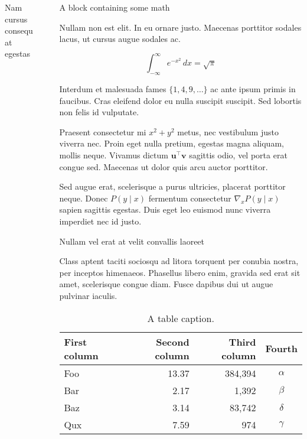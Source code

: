 \documentclass[final]{beamer}
\newlength{\sepwidth}
\newlength{\colwidth}
\newcommand{\separatorcolumn}{\begin{column}{\sepwidth}\end{column}}
\begin{document}
\begin{frame}[t]
\begin{columns}[t]
\begin{column}{\colwidth}
\begin{block}{Nam cursus consequat egestas}
  \end{block}

\end{column}

\separatorcolumn

\begin{column}{\colwidth}

  \begin{block}{A block containing some math}

    Nullam non est elit. In eu ornare justo. Maecenas porttitor sodales lacus,
    ut cursus augue sodales ac.

    $$
    \int_{-\infty}^{\infty} e^{-x^2}\,dx = \sqrt{\pi}
    $$

    Interdum et malesuada fames $\{1, 4, 9, \ldots\}$ ac ante ipsum primis in
    faucibus. Cras eleifend dolor eu nulla suscipit suscipit. Sed lobortis non
    felis id vulputate.


    Praesent consectetur mi $x^2 + y^2$ metus, nec vestibulum justo viverra
    nec. Proin eget nulla pretium, egestas magna aliquam, mollis neque. Vivamus
    dictum $\mathbf{u}^\intercal\mathbf{v}$ sagittis odio, vel porta erat
    congue sed. Maecenas ut dolor quis arcu auctor porttitor.


    Sed augue erat, scelerisque a purus ultricies, placerat porttitor neque.
    Donec $P(y \mid x)$ fermentum consectetur $\nabla_x P(y \mid x)$ sapien
    sagittis egestas. Duis eget leo euismod nunc viverra imperdiet nec id
    justo.

  \end{block}

  \begin{block}{Nullam vel erat at velit convallis laoreet}

    Class aptent taciti sociosqu ad litora torquent per conubia nostra, per
    inceptos himenaeos. Phasellus libero enim, gravida sed erat sit amet,
    scelerisque congue diam. Fusce dapibus dui ut augue pulvinar iaculis.

    \begin{table}
      \centering
      \begin{tabular}{l r r c}
        \toprule
        \textbf{First column} & \textbf{Second column} & \textbf{Third column} & \textbf{Fourth} \\
        \midrule
        Foo & 13.37 & 384,394 & $\alpha$ \\
        Bar & 2.17 & 1,392 & $\beta$ \\
        Baz & 3.14 & 83,742 & $\delta$ \\
        Qux & 7.59 & 974 & $\gamma$ \\
        \bottomrule
      \end{tabular}
      \caption{A table caption.}
    \end{table}


\end{block}
\end{column}
\end{columns}
\end{frame}
\end{document}
